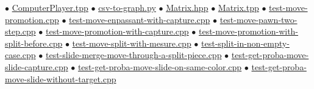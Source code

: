 \begin{frame}
$\bullet$ \hyperlink{ComputerPlayer.tpp}{ComputerPlayer.tpp}\newline
$\bullet$ \hyperlink{csv-to-graph.py}{csv-to-graph.py}\newline
$\bullet$ \hyperlink{Matrix.hpp}{Matrix.hpp}\newline
$\bullet$ \hyperlink{Matrix.tpp}{Matrix.tpp}\newline
$\bullet$ \hyperlink{testmovepromotion.cpp}{test-move-promotion.cpp}\newline
$\bullet$ \hyperlink{testmoveenpassantwithcapture.cpp}{test-move-enpassant-with-capture.cpp}\newline
$\bullet$ \hyperlink{testmovepawntwostep.cpp}{test-move-pawn-two-step.cpp}\newline
$\bullet$ \hyperlink{testmovepromotionwithcapture.cpp}{test-move-promotion-with-capture.cpp}\newline
$\bullet$ \hyperlink{testmovepromotionwithsplitbefore.cpp}{test-move-promotion-with-split-before.cpp}\newline
$\bullet$ \hyperlink{testmovesplitwithmesure.cpp}{test-move-split-with-mesure.cpp}\newline
$\bullet$ \hyperlink{testsplitinnonemptycase.cpp}{test-split-in-non-empty-case.cpp}\newline
$\bullet$ \hyperlink{testslidemergemovethroughasplitpiece.cpp}{test-slide-merge-move-through-a-split-piece.cpp}\newline
$\bullet$ \hyperlink{testgetprobamoveslidecapture.cpp}{test-get-proba-move-slide-capture.cpp}\newline
$\bullet$ \hyperlink{testgetprobamoveslideonsamecolor.cpp}{test-get-proba-move-slide-on-same-color.cpp}\newline
$\bullet$ \hyperlink{testgetprobamoveslidewithouttarget.cpp}{test-get-proba-move-slide-without-target.cpp}\newline

\end{frame}
